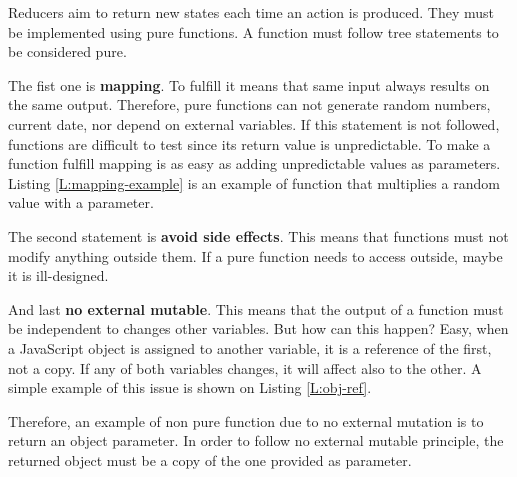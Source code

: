 Reducers aim to return new states each time an action is produced. They must be
implemented using pure functions. A function must follow tree statements to be 
considered pure.

The fist one is \textbf{mapping}. To fulfill it means that same input always 
results on the same output. Therefore, pure functions can not generate random
numbers, current date, nor depend on external variables. If this statement is
not followed, functions are difficult to test since its return value is
unpredictable. To make a function fulfill mapping is as easy as adding 
unpredictable values as parameters. Listing \ref{L:mapping-example} is an 
example of function that multiplies a random value with a parameter.

\begin{codefigure}
\end{codefigure}

The second statement is \textbf{avoid side effects}. This means that functions
must not modify anything outside them. If a pure function needs to access
outside, maybe it is ill-designed. 

\begin{codefigure}
\end{codefigure}

And last \textbf{no external mutable}. This means that the output of a
function must be independent to changes other variables. But how can this
happen? Easy, when a JavaScript object is assigned to another variable, it is a
reference of the first, not a copy. If any of both variables changes, it
will affect also to the other. A simple example of this issue is shown on 
Listing \ref{L:obj-ref}.

\begin{codefigure}
\end{codefigure}

Therefore, an example of non pure function due to no external mutation is to
return an object parameter. In order to follow no external mutable principle,
the returned object must be a copy of the one provided as parameter.

\begin{codefigure}
\end{codefigure}


